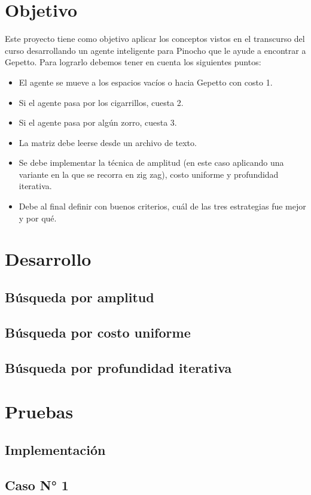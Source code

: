 \documentclass[12pt, letterpaper]{article}
\begin{document}
\section{Objetivo}
Este proyecto tiene como objetivo aplicar los conceptos vistos en el transcurso del curso desarrollando un agente inteligente para Pinocho que le ayude a encontrar a Gepetto. Para lograrlo debemos tener en cuenta los siguientes puntos:
\begin{itemize}
    \item El agente se mueve a los espacios vacíos o hacia Gepetto con costo 1.
    \item Si el agente pasa por los cigarrillos, cuesta 2.
    \item Si el agente pasa por algún zorro, cuesta 3.
    \item La matriz debe leerse desde un archivo de texto.
    \item Se debe implementar la técnica de amplitud (en este caso aplicando una variante en la que se recorra en zig zag), costo uniforme y profundidad iterativa.
    \item Debe al final definir con buenos criterios, cuál de las tres estrategias fue mejor y por qué.
\end{itemize}
\clearpage
\section{Desarrollo}

\subsection{Búsqueda por amplitud}

\subsection{Búsqueda por costo uniforme}

\subsection{Búsqueda por profundidad iterativa}


\section{Pruebas}
\subsection{Implementación}

\subsection{Caso N° 1}

\end{document}
